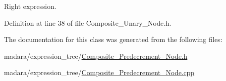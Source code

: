 Right expression. 



Definition at line 38 of file Composite\_\-Unary\_\-Node.h.



The documentation for this class was generated from the following files:\begin{DoxyCompactItemize}
\item 
madara/expression\_\-tree/\hyperlink{Composite__Predecrement__Node_8h}{Composite\_\-Predecrement\_\-Node.h}\item 
madara/expression\_\-tree/\hyperlink{Composite__Predecrement__Node_8cpp}{Composite\_\-Predecrement\_\-Node.cpp}\end{DoxyCompactItemize}
